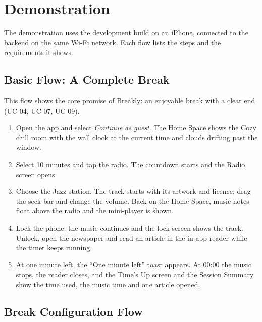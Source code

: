\chapter{Demonstration}
\label{chap:demonstration}

The demonstration uses the development build on an iPhone, connected to the
backend on the same Wi-Fi network. Each flow lists the steps and the
requirements it shows.

\section{Basic Flow: A Complete Break}
\label{sec:basic-flow}

This flow shows the core promise of Breakly: an enjoyable break with a clear
end (UC-04, UC-07, UC-09).
\begin{enumerate}[leftmargin=1.8em,itemsep=2pt]
  \item Open the app and select \textit{Continue as guest}. The Home Space
        shows the Cozy chill room with the wall clock at the current time and
        clouds drifting past the window.
  \item Select 10 minutes and tap the radio. The countdown starts and the
        Radio screen opens.
  \item Choose the Jazz station. The track starts with its artwork and
        licence; drag the seek bar and change the volume. Back on the Home
        Space, music notes float above the radio and the mini-player is shown.
  \item Lock the phone: the music continues and the lock screen shows the
        track. Unlock, open the newspaper and read an article in the in-app
        reader while the timer keeps running.
  \item At one minute left, the ``One minute left'' toast appears. At 00:00
        the music stops, the reader closes, and the Time's Up screen and the
        Session Summary show the time used, the music time and one article
        opened.
\end{enumerate}

\section{Break Configuration Flow}
\label{sec:break-configuration-flow}

